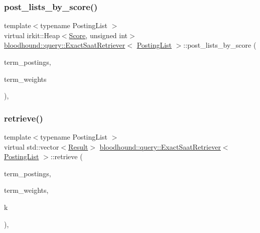\subsubsection{\texorpdfstring{post\+\_\+lists\+\_\+by\+\_\+score()}{post\_lists\_by\_score()}}
{\footnotesize\ttfamily template$<$typename Posting\+List $>$ \\
virtual irkit\+::\+Heap$<$\hyperlink{structbloodhound_1_1Score}{Score}, unsigned int$>$ \hyperlink{classbloodhound_1_1query_1_1ExactSaatRetriever}{bloodhound\+::query\+::\+Exact\+Saat\+Retriever}$<$ \hyperlink{classbloodhound_1_1PostingList}{Posting\+List} $>$\+::post\+\_\+lists\+\_\+by\+\_\+score (\begin{DoxyParamCaption}\item[{const std\+::vector$<$ \hyperlink{classbloodhound_1_1PostingList}{Posting\+List} $>$ \&}]{term\+\_\+postings,  }\item[{const std\+::vector$<$ \hyperlink{structbloodhound_1_1Score}{Score} $>$ \&}]{term\+\_\+weights }\end{DoxyParamCaption})\hspace{0.3cm}{\ttfamily [inline]}, {\ttfamily [virtual]}}

\mbox{\label{classbloodhound_1_1query_1_1ExactSaatRetriever_aced2763cc2a4c12838fef4a20759049e}} 
\subsubsection{\texorpdfstring{retrieve()}{retrieve()}}
{\footnotesize\ttfamily template$<$typename Posting\+List $>$ \\
virtual std\+::vector$<$\hyperlink{structbloodhound_1_1query_1_1Result}{Result}$>$ \hyperlink{classbloodhound_1_1query_1_1ExactSaatRetriever}{bloodhound\+::query\+::\+Exact\+Saat\+Retriever}$<$ \hyperlink{classbloodhound_1_1PostingList}{Posting\+List} $>$\+::retrieve (\begin{DoxyParamCaption}\item[{const std\+::vector$<$ \hyperlink{classbloodhound_1_1PostingList}{Posting\+List} $>$ \&}]{term\+\_\+postings,  }\item[{const std\+::vector$<$ \hyperlink{structbloodhound_1_1Score}{Score} $>$ \&}]{term\+\_\+weights,  }\item[{std\+::size\+\_\+t}]{k }\end{DoxyParamCaption})\hspace{0.3cm}{\ttfamily [inline]}, {\ttfamily [virtual]}}



